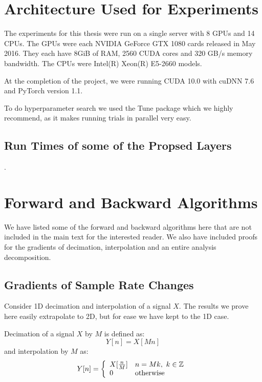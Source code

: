 \chapter{Architecture Used for Experiments} \label{app:arch}

\def \path {dtcwt_scat}
\def \imgpath {\path/images}

The experiments for this thesis were run on a single server with 8 GPUs and 14
CPUs. The GPUs were each NVIDIA GeForce GTX 1080 cards released in May 2016.
They each have 8GiB of RAM, 2560 CUDA cores and 320 GB/s memory bandwidth.
The CPUs were Intel(R) Xeon(R) E5-2660 models. 

At the completion of the project, we were running CUDA 10.0 with cuDNN 7.6 and 
PyTorch version 1.1.

To do hyperparameter search we used the Tune package \cite{liaw2018tune} which
we highly recommend, as it makes running trials in parallel very easy.

\section{Run Times of some of the Propsed Layers}
.

\chapter{Forward and Backward Algorithms} \label{app:ch3:fwd_bwd}
We have listed some of the forward and backward algorithms here that are not
included in the main text for the interested reader. We also have included 
proofs for the gradients of decimation, interpolation and an entire analysis
decomposition.

\section{Gradients of Sample Rate Changes}\label{sec:app:samplegrads}
Consider 1D decimation and interpolation of a signal $X$. The results we prove
here easily extrapolate to 2D, but for ease we have kept to the 1D case. 

Decimation of a signal $X$ by $M$ is defined as:
\begin{equation}
  Y[n] = X[Mn] \label{eq:app:decimation}
\end{equation}
and interpolation by $M$ as:
\begin{equation}
  Y[n] = \left\{ \begin{array}{ll}
    X[\frac{n}{M}] & n = Mk,\ k\in \mathbb{Z}^{} \\
    0 & \text{otherwise} \\ 
  \end{array}\right.
  \label{eq:app:interpolation}
\end{equation}

